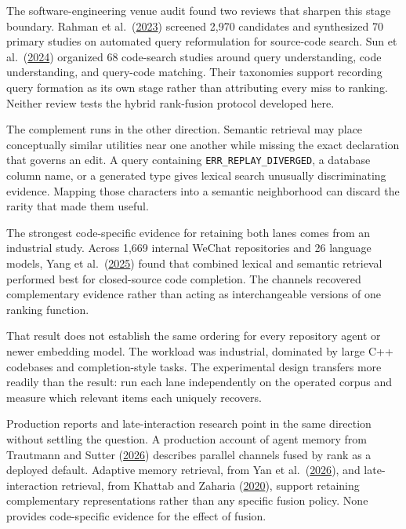 The software-engineering venue audit found two reviews that sharpen this stage boundary. Rahman et al.~(\href{https://doi.org/10.1145/3607179}{2023}) screened 2,970 candidates and synthesized 70 primary studies on automated query reformulation for source-code search. Sun et al.~(\href{https://doi.org/10.1145/3656341}{2024}) organized 68 code-search studies around query understanding, code understanding, and query-code matching. Their taxonomies support recording query formation as its own stage rather than attributing every miss to ranking. Neither review tests the hybrid rank-fusion protocol developed here.

The complement runs in the other direction. Semantic retrieval may place conceptually similar utilities near one another while missing the exact declaration that governs an edit. A query containing \texttt{ERR\_REPLAY\_DIVERGED}, a database column name, or a generated type gives lexical search unusually discriminating evidence. Mapping those characters into a semantic neighborhood can discard the rarity that made them useful.

The strongest code-specific evidence for retaining both lanes comes from an industrial study. Across 1,669 internal WeChat repositories and 26 language models, Yang et al.~(\href{https://arxiv.org/abs/2507.18515}{2025}) found that combined lexical and semantic retrieval performed best for closed-source code completion. The channels recovered complementary evidence rather than acting as interchangeable versions of one ranking function.

That result does not establish the same ordering for every repository agent or newer embedding model. The workload was industrial, dominated by large C++ codebases and completion-style tasks. The experimental design transfers more readily than the result: run each lane independently on the operated corpus and measure which relevant items each uniquely recovers.

Production reports and late-interaction research point in the same direction without settling the question. A production account of agent memory from Trautmann and Sutter (\href{https://blog.cloudflare.com/introducing-agent-memory/}{2026}) describes parallel channels fused by rank as a deployed default. Adaptive memory retrieval, from Yan et al.~(\href{https://arxiv.org/abs/2603.16496}{2026}), and late-interaction retrieval, from Khattab and Zaharia (\href{https://arxiv.org/abs/2004.12832}{2020}), support retaining complementary representations rather than any specific fusion policy. None provides code-specific evidence for the effect of fusion.

